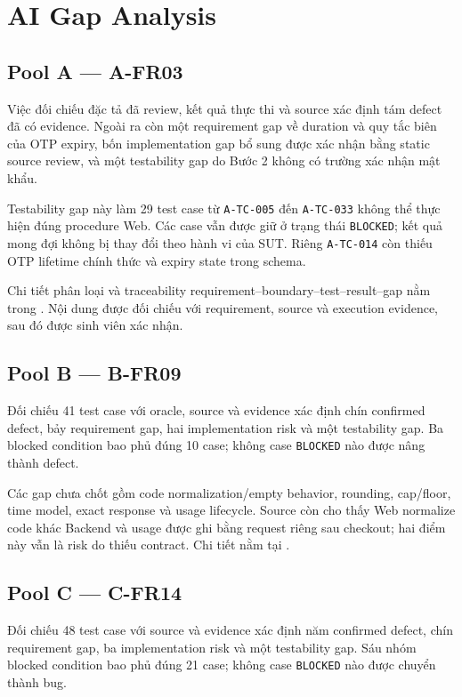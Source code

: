 \chapter{AI Gap Analysis}

\section{Pool A --- A-FR03}

Việc đối chiếu đặc tả đã review, kết quả thực thi và source xác định tám defect
đã có evidence. Ngoài ra còn một requirement gap về duration và quy tắc biên
của OTP expiry, bốn implementation gap bổ sung được xác nhận bằng static source
review, và một testability gap do Bước 2 không có trường xác nhận mật khẩu.

Testability gap này làm 29 test case từ \texttt{A-TC-005} đến
\texttt{A-TC-033} không thể thực hiện đúng procedure Web. Các case vẫn được giữ
ở trạng thái \texttt{BLOCKED}; kết quả mong đợi không bị thay đổi theo hành vi
của SUT. Riêng \texttt{A-TC-014} còn thiếu OTP lifetime chính thức và expiry
state trong schema.

Chi tiết phân loại và traceability requirement--boundary--test--result--gap nằm
trong . Nội dung được đối chiếu với
requirement, source và execution evidence, sau đó được sinh viên xác nhận.

\section{Pool B --- B-FR09}

Đối chiếu 41 test case với oracle, source và evidence xác định chín confirmed
defect, bảy requirement gap, hai implementation risk và một testability gap.
Ba blocked condition bao phủ đúng 10 case; không case \texttt{BLOCKED} nào được
nâng thành defect.

Các gap chưa chốt gồm code normalization/empty behavior, rounding, cap/floor,
time model, exact response và usage lifecycle. Source còn cho thấy Web normalize
code khác Backend và usage được ghi bằng request riêng sau checkout; hai điểm
này vẫn là risk do thiếu contract. Chi tiết nằm tại
.

\section{Pool C --- C-FR14}

Đối chiếu 48 test case với source và evidence xác định năm confirmed defect,
chín requirement gap, ba implementation risk và một testability gap. Sáu nhóm
blocked condition bao phủ đúng 21 case; không case \texttt{BLOCKED} nào được
chuyển thành bug.


